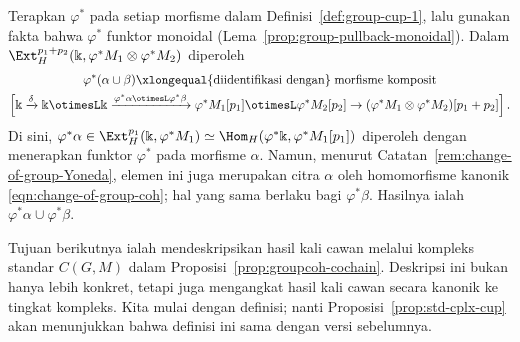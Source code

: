 \begin{bukti}
	Terapkan $\varphi^*$ pada setiap morfisme dalam
	Definisi~\ref{def:group-cup-1}, lalu gunakan fakta bahwa $\varphi^*$ funktor
	monoidal (Lema~\ref{prop:group-pullback-monoidal}). Dalam
	$\Ext_H^{p_1+p_2}(\Bbbk,\varphi^*M_1\otimes\varphi^*M_2)$ diperoleh
	\begin{multline*}
		\varphi^*(\alpha \cup \beta) \xlongequal{\text{diidentifikasi dengan}} \;\text{morfisme komposit} \\
		\left[ \Bbbk \xrightarrow{\delta} \Bbbk \otimesL \Bbbk \xrightarrow{\varphi^* \alpha \otimesL \varphi^* \beta} \varphi^* M_1[p_1] \otimesL \varphi^* M_2[p_2] \to (\varphi^* M_1 \otimes \varphi^* M_2)[p_1 + p_2] \right].
	\end{multline*}
	Di sini,
	$\varphi^*\alpha\in\Ext_H^{p_1}(\Bbbk,\varphi^*M_1)
	\simeq\Hom_H(\varphi^*\Bbbk,\varphi^*M_1[p_1])$ diperoleh dengan
	menerapkan funktor $\varphi^*$ pada morfisme $\alpha$. Namun, menurut
	Catatan~\ref{rem:change-of-group-Yoneda}, elemen ini juga merupakan citra
	$\alpha$ oleh homomorfisme kanonik \eqref{eqn:change-of-group-coh}; hal yang
	sama berlaku bagi $\varphi^*\beta$. Hasilnya ialah
	$\varphi^*\alpha\cup\varphi^*\beta$.
\end{bukti}

Tujuan berikutnya ialah mendeskripsikan hasil kali cawan melalui kompleks
standar $C(G,M)$ dalam Proposisi~\ref{prop:groupcoh-cochain}. Deskripsi ini
bukan hanya lebih konkret, tetapi juga mengangkat hasil kali cawan secara
kanonik ke tingkat kompleks. Kita mulai dengan definisi; nanti
Proposisi~\ref{prop:std-cplx-cup} akan menunjukkan bahwa definisi ini sama
dengan versi sebelumnya.

